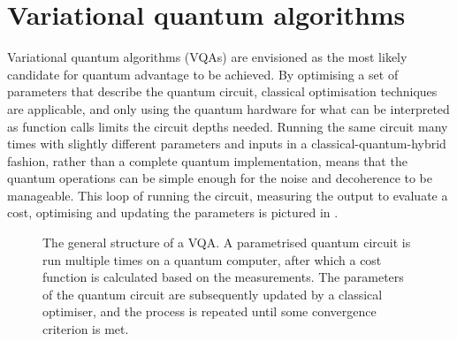 \section{Variational quantum algorithms}
\label{sec:vqa}
Variational quantum algorithms (VQAs) are envisioned as the most likely candidate for quantum advantage to be achieved.
By optimising a set of parameters that describe the quantum circuit, classical optimisation techniques are applicable, and only using the quantum hardware for what can be interpreted as function calls limits the circuit depths needed.
Running the same circuit many times with slightly different parameters and inputs in a classical-quantum-hybrid fashion, rather than a complete quantum implementation, means that the quantum operations can be simple enough for the noise and decoherence to be manageable.
This loop of running the circuit, measuring the output to evaluate a cost, optimising and updating the parameters is pictured in .

\begin{figure}
    \centering
    \caption{
        The general structure of a VQA.
        A parametrised quantum circuit is run multiple times on a quantum computer, after which a cost function is calculated based on the measurements.
        The parameters of the quantum circuit are subsequently updated by a classical optimiser, and the process is repeated until some convergence criterion is met.
    }
    \label{fig:vqa}
\end{figure}

